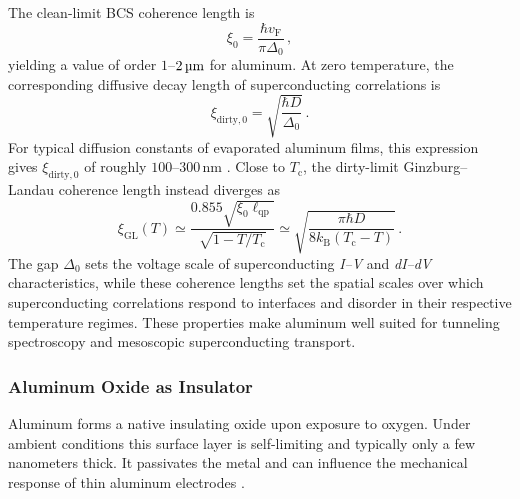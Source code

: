             The clean-limit BCS coherence length is
            \begin{equation}
                \xi_0 = \frac{\hbar v_\mathrm{F}}{\pi\Delta_0}\,,
                \label{eq:platform:aluminum-clean-coherence-length}
            \end{equation}
            yielding a value of order $1$--$2\,\text{\textmu m}$ for aluminum. At zero temperature, the corresponding diffusive decay length of superconducting correlations is
            \begin{equation}
                \xi_{\mathrm{dirty},0}
                = \sqrt{\frac{\hbar D}{\Delta_0}}\,.
                \label{eq:platform:aluminum-dirty-coherence-length}
            \end{equation}
            For typical diffusion constants of evaporated aluminum films, this expression gives $\xi_{\mathrm{dirty},0}$ of roughly $100$--$300\,\mathrm{nm}$ \cite{tinkham_introduction_2004,steinberg_quasi-particle_2008}. Close to $T_\mathrm{c}$, the dirty-limit Ginzburg--Landau coherence length instead diverges as
            \begin{equation}
                \xi_\mathrm{GL}(T)
                \simeq
                \frac{0.855\sqrt{\xi_0\ell_\mathrm{qp}}}
                     {\sqrt{1-T/T_\mathrm{c}}}
                \simeq
                \sqrt{\frac{\pi\hbar D}
                            {8k_\mathrm{B}(T_\mathrm{c}-T)}}\,.
                \label{eq:platform:aluminum-gl-coherence-length}
            \end{equation}
            The gap $\Delta_0$ sets the voltage scale of superconducting \textit{I--V} and \textit{dI--dV} characteristics, while these coherence lengths set the spatial scales over which superconducting correlations respond to interfaces and disorder in their respective temperature regimes. These properties make aluminum well suited for tunneling spectroscopy and mesoscopic superconducting transport. \cite{tinkham_introduction_2004, murray_material_2021}

        \subsubsection*{Aluminum Oxide as Insulator}

            Aluminum forms a native insulating oxide upon exposure to oxygen. Under ambient conditions this surface layer is self-limiting and typically only a few nanometers thick. It passivates the metal and can influence the mechanical response of thin aluminum electrodes \cite{saif_effect_2002}.

